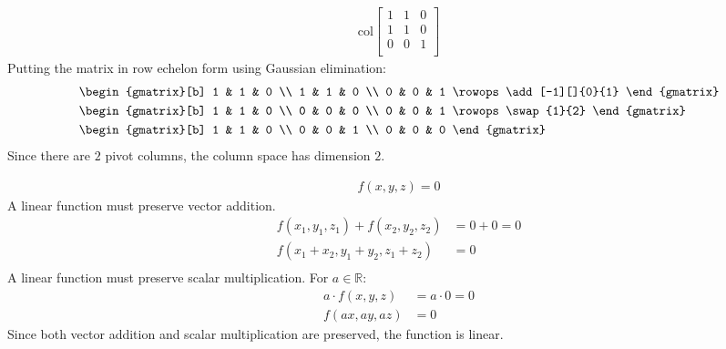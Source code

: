 \documentclass{article}
\begin{document}
\begin{align*}
    \mathrm{col} \begin{bmatrix}
        1 & 1 & 0 \\
        1 & 1 & 0 \\
        0 & 0 & 1 \\
    \end{bmatrix}
\end{align*}
Putting the matrix in row echelon form using Gaussian elimination:
\begin{align*}
    & \begin{gmatrix}[b]
        1 & 1 & 0 \\
        1 & 1 & 0 \\
        0 & 0 & 1
    \rowops
    \add[-1][]{0}{1}
    \end{gmatrix}  \\
    & \begin{gmatrix}[b]
        1 & 1 & 0 \\
        0 & 0 & 0 \\
        0 & 0 & 1
    \rowops
    \swap{1}{2}
    \end{gmatrix}   \\
    & \begin{gmatrix}[b]
        1 & 1 & 0 \\
        0 & 0 & 1 \\
        0 & 0 & 0
    \end{gmatrix} 
\end{align*}
Since there are $2$ pivot columns, the column space has dimension $2$.
\clearpage

\problem{}
\begin{align*}
    f(x, y, z) = 0
\end{align*}
A linear function must preserve vector addition.
\begin{align*}
    f(x_1, y_1, z_1) + f(x_2, y_2, z_2) & = 0 + 0 = 0 \\
    f(x_1 + x_2, y_1 + y_2, z_1 + z_2) & = 0 \\
\end{align*}
A linear function must preserve scalar multiplication. For $a \in \mathbb{R}$:
\begin{align*}
    a \cdot f(x, y, z) & = a \cdot 0 = 0 \\
    f(ax, ay, az) & = 0
\end{align*}
Since both vector addition and scalar multiplication are preserved, the function is linear.
\end{document}
